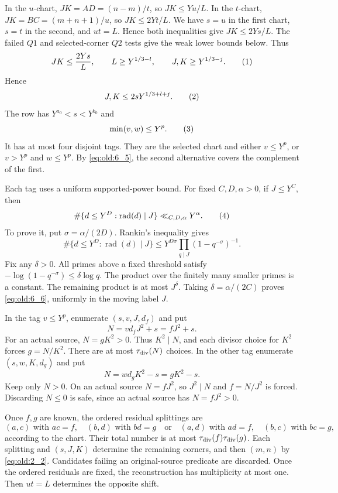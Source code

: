 In the \(u\)-chart, \(JK=AD=(n-m)/t\), so \(JK\le Yu/L\).  In the
\(t\)-chart, \(JK=BC=(m+n+1)/u\), so \(JK\le2Yt/L\).  We have
\(s=u\) in the first chart, \(s=t\) in the second, and \(ut=L\).  Hence
both inequalities give \(JK\le2Ys/L\).  The failed \(Q1\) and
selected-corner \(Q2\) tests give the weak lower bounds below.  Thus
\[
 JK\le \frac{2Ys}{L},\qquad
 L\ge Y^{1/3-l},\qquad J,K\ge Y^{1/3-j}.
\AutoTag{eq:old:6_3}
\]
Hence
\[
 J,K\le 2sY^{1/3+l+j}.                                  \AutoTag{eq:old:6_4}
\]
The row has $Y^{a_0}<s<Y^{b_0}$ and
\[
 \min(v,w)\le Y^p.
\AutoTag{eq:old:6_5}
\]
It has at most four disjoint tags.  They are the selected chart and either
$v\le Y^p$, or $v>Y^p$ and $w\le Y^p$.  By \eqref{eq:old:6_5}, the second
alternative covers the complement of the first.

Each tag uses a uniform supported-power bound.
For fixed $C,D,\alpha>0$, if $J\le Y^C$, then
\[
 \#\{d\le Y^D:\operatorname{rad}(d)\mid J\}
 \ll_{C,D,\alpha}Y^\alpha.                           \AutoTag{eq:old:6_6}
\]
To prove it, put $\sigma=\alpha/(2D)$.  Rankin's inequality gives
\[
 \#\{d\le Y^D:\operatorname{rad}(d)\mid J\}
 \le Y^{D\sigma}\prod_{q\mid J}(1-q^{-\sigma})^{-1}.
\]
Fix any $\delta>0$.  All primes above a fixed threshold satisfy
$-\log(1-q^{-\sigma})\le\delta\log q$.  The product over the finitely many
smaller primes is a constant.  The remaining product is at most
$J^\delta$.  Taking $\delta=\alpha/(2C)$ proves \eqref{eq:old:6_6},
uniformly in the moving label $J$.

In the tag $v\le Y^p$, enumerate $(s,v,J,d_f)$ and put
\[
 N=vd_fJ^2+s=fJ^2+s.
\]
For an actual source, $N=gK^2>0$.  Thus $K^2\mid N$, and each divisor
choice for $K^2$ forces $g=N/K^2$.  There are at most $\tau_{\mathrm{div}}(N)$ choices.
In the other tag enumerate $(s,w,K,d_g)$ and put
\[
 N=wd_gK^2-s=gK^2-s.
\]
Keep only \(N>0\).  On an actual source \(N=fJ^2\), so \(J^2\mid N\) and
$f=N/J^2$ is forced.  Discarding \(N\le0\) is safe, since an actual source
has \(N=fJ^2>0\).

Once $f,g$ are known, the ordered residual splittings are
\[
 (a,c)\text{ with }ac=f,\quad (b,d)\text{ with }bd=g
 \quad\text{or}\quad
 (a,d)\text{ with }ad=f,\quad (b,c)\text{ with }bc=g,
\]
according to the chart.  Their total number is at most $\tau_{\mathrm{div}}(f)\tau_{\mathrm{div}}(g)$.
Each splitting and $(s,J,K)$ determine the remaining corners, and then
$(m,n)$ by \eqref{eq:old:2_2}.  Candidates failing an original-source
predicate are discarded.  Once the ordered residuals are fixed, the
reconstruction has multiplicity at most one.  Then $ut=L$ determines the
opposite shift.

